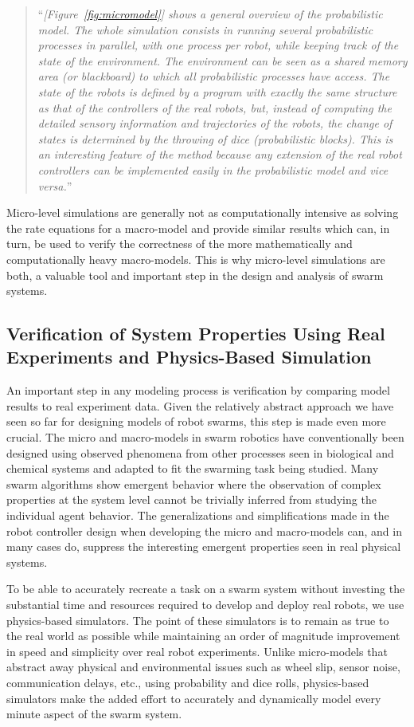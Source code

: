 \documentclass[Main.tex]{subfiles}
\begin{document}
\begin{quote}
``\emph{[Figure~\ref{fig:micromodel}] shows a general overview of the probabilistic model. The whole simulation consists in running several probabilistic processes in parallel, with one process per robot, while keeping track of the state of the environment. The environment can be seen as a shared memory area (or blackboard) to which all probabilistic processes have access. The state of the robots is defined by a program with exactly the same structure as that of the controllers of the real robots, but, instead of computing the detailed sensory information and trajectories of the robots, the change of states is determined by the throwing of dice (probabilistic blocks). This is an interesting feature of the method because any extension of the real robot controllers can be implemented easily in the probabilistic model and vice versa.}''
\end{quote}

Micro-level simulations are generally not as computationally intensive as solving the rate equations for a macro-model and provide similar results which can, in turn, be used to verify the correctness of the more mathematically and computationally heavy macro-models. This is why micro-level simulations are both, a valuable tool and important step in the design and analysis of swarm systems.

\subsection{Verification of System Properties Using Real Experiments and Physics-Based Simulation}
An important step in any modeling process is verification by comparing model results to real experiment data. Given the relatively abstract approach we have seen so far for designing models of robot swarms, this step is made even more crucial. The micro and macro-models in swarm robotics have conventionally been designed using observed phenomena from other processes seen in biological and chemical systems and adapted to fit the swarming task being studied. Many swarm algorithms show emergent behavior where the observation of complex properties at the system level cannot be trivially inferred from studying the individual agent behavior. The generalizations and simplifications made in the robot controller design when developing the micro and macro-models can, and in many cases do, suppress the interesting emergent properties seen in real physical systems. 

To be able to accurately recreate a task on a swarm system without investing the substantial time and resources required to develop and deploy real robots, we use physics-based simulators. The point of these simulators is to remain as true to the real world as possible while maintaining an order of magnitude improvement in speed and simplicity over real robot experiments. Unlike micro-models that abstract away physical and environmental issues such as wheel slip, sensor noise, communication delays, etc., using probability and dice rolls, physics-based simulators make the added effort to accurately and dynamically model every minute aspect of the swarm system.
\end{document}
